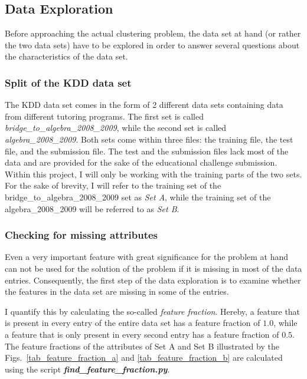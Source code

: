 \subsection{Data Exploration}

Before approaching the actual clustering problem, the data set at hand (or rather the two data sets) have to be explored in order to answer several questions about the characteristics of the data set.

\subsubsection{Split of the KDD data set}

The KDD data set comes in the form of 2 different data sets containing data from different tutoring programs. The first set is called \emph{bridge\_to\_algebra\_2008\_2009}, while the second set is called \emph{algebra\_2008\_2009}. Both sets come within three files: the training file, the test file, and the submission file. The test and the submission files lack most of the data and are provided for the sake of the educational challenge submission. Within this project, I will only be working with the training parts of the two sets. For the sake of brevity, I will refer to the training set of the bridge\_to\_algebra\_2008\_2009 set as \emph{Set A}, while the training set of the algebra\_2008\_2009 will be referred to as \emph{Set B}.

\subsubsection{Checking for missing attributes}

Even a very important feature with great significance for the problem at hand can not be used for the solution of the problem if it is missing in most of the data entries. Consequently, the first step of the data exploration is to examine whether the features in the data set are missing in some of the entries. 

I quantify this by calculating the so-called \emph{feature fraction}. Hereby, a feature that is present in every entry of the entire data set has a feature fraction of $1.0$, while a feature that is only present in every second entry has a feature fraction of $0.5$. The feature fractions of the attributes of Set A and Set B illustrated by the Figs.~\ref{tab_feature_fraction_a} and \ref{tab_feature_fraction_b} are calculated using the script \textbf{\emph{find\_feature\_fraction.py}}.

